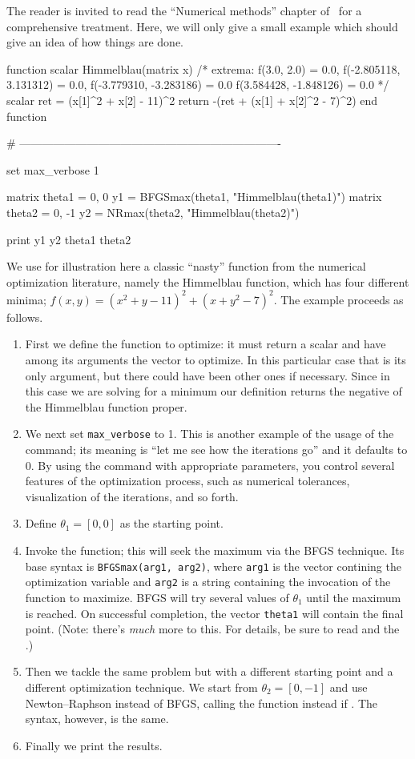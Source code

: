 The reader is invited to read the ``Numerical methods'' chapter of
\GUG\ for a comprehensive treatment. Here, we will only give a small
example which should give an idea of how things are done.

\begin{code}
function scalar Himmelblau(matrix x)
    /* extrema:
    f(3.0, 2.0) = 0.0, 
    f(-2.805118, 3.131312) = 0.0,
    f(-3.779310, -3.283186) = 0.0
    f(3.584428, -1.848126) = 0.0
    */
    scalar ret = (x[1]^2 + x[2] - 11)^2
    return -(ret + (x[1] + x[2]^2 - 7)^2)
end function

# ----------------------------------------------------------------------

set max_verbose 1

matrix theta1 = { 0, 0 }
y1 = BFGSmax(theta1, "Himmelblau(theta1)")
matrix theta2 = { 0, -1 }
y2 = NRmax(theta2, "Himmelblau(theta2)")

print y1 y2 theta1 theta2
\end{code}

We use for illustration here a classic ``nasty'' function from the
numerical optimization literature, namely the Himmelblau function,
which has four different minima; $f(x, y) = (x^2+y-11)^2 +
(x+y^2-7)^2$. The example proceeds as follows.
\begin{enumerate}
\item First we define the function to optimize: it must return a
  scalar and have among its arguments the vector to optimize. In this
  particular case that is its only argument, but there could have been
  other ones if necessary.  Since in this case we are solving for a
  minimum our definition returns the negative of the Himmelblau
  function proper.
\item We next set \verb|max_verbose| to 1. This is another example of
  the usage of the  command; its meaning is ``let me see how
  the iterations go'' and it defaults to 0. By using the 
  command with appropriate parameters, you control several features of
  the optimization process, such as numerical tolerances,
  visualization of the iterations, and so forth.
\item Define $\theta_1 = [0, 0]$ as the starting point.
\item Invoke the  function; this will seek the maximum
  via the BFGS technique. Its base syntax is \texttt{BFGSmax(arg1,
    arg2)}, where \texttt{arg1} is the vector contining the
  optimization variable and \texttt{arg2} is a string containing the
  invocation of the function to maximize. BFGS will try several values
  of $\theta_1$ until the maximum is reached. On successful
  completion, the vector \texttt{theta1} will contain the final
  point. (Note: there's \emph{much} more to this. For details, be sure
  to read \GUG and the \GCR.)
\item Then we tackle the same problem but with a different starting
  point and a different optimization technique. We start from
  $\theta_2 = [0, -1]$ and use Newton--Raphson instead of BFGS,
  calling the  function instead if . The
  syntax, however, is the same.
\item Finally we print the results.
\end{enumerate}

